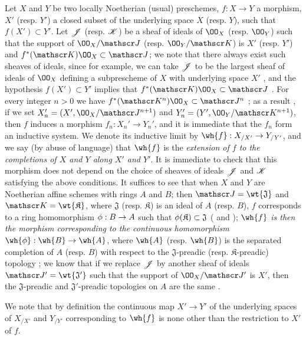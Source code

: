 \begin{env}[10.9.1]
\label{1.10.9.1}
Let $X$ and $Y$ be two locally Noetherian (usual) preschemes, $f:X\to Y$ a morphism, $X'$ (resp. $Y'$) a closed subset of the underlying space $X$ (resp. $Y$), such that $f(X')\subset Y'$.
Let $\mathscr{J}$ (resp. $\mathscr{K}$) be a sheaf of ideals of $\OO_X$ (resp. $\OO_Y$) such that the support of $\OO_X/\sh{J}$ (resp. $\OO_Y/\sh{K}$) is $X'$ (resp. $Y'$) and $f^*(\sh{K})\OO_X\subset\sh{J}$; we note that there always exist such sheaves of ideals, since for example, we can take $\mathscr{J}$ to be the largest sheaf of ideals of $\OO_X$ defining a subprescheme of $X$ with underlying space $X'$ , and the hypothesis $f(X')\subset Y'$ implies that $f^*(\sh{K})\OO_X\subset\sh{J}$ .
For every integer $n>0$ we have $f^*(\sh{K}^n)\OO_X\subset\sh{J}^n$ ; as a result , if we set $X_n'=(X',\OO_X/\sh{J}^{n+1})$ and $Y_n'=(Y',\OO_Y/\sh{K}^{n+1})$, then $f$ induces a morphism $f_n:X_n'\to Y_n'$, and it is immediate that the $f_n$ form an inductive system.
We denote its inductive limit  by $\wh{f}:X_{/X'}\to Y_{/Y'}$, and we say (by abuse of language) that $\wh{f}$ is the \emph{extension of $f$ to the completions of $X$ and $Y$ along $X'$ and $Y'$}.
It is immediate to check that this morphism does not depend on the choice of sheaves of ideals $\mathscr{J}$ and $\mathscr{K}$ satisfying the above conditions.
It suffices to see that when $X$ and $Y$ are Noetherian affine schemes with rings $A$ and $B$; then $\sh{J}=\wt{\mathfrak{J}}$ and $\sh{K}=\wt{\mathfrak{K}}$, where $\mathfrak{J}$ (resp. $\mathfrak{K}$) is an ideal of $A$ (resp. $B$), $f$ corresponds to a ring homomorphism $\vphi:B\to A$ such that $\phi(\mathfrak{K})\subset\mathfrak{J}$ ( and ); \emph{$\wh{f}$ is then the morphism corresponding  to the continuous homomorphism $\wh{\vphi}:\wh{B}\to\wh{A}$}, where $\wh{A}$ (resp. $\wh{B}$) is the separated completion of $A$ (resp. $B$) with respect to the $\mathfrak{J}$-preadic (resp. $\mathfrak{K}$-preadic) topology ; we know that if we replace $\mathscr{J}$ by another
sheaf of ideals $\sh{J}'=\wt{\mathfrak{J}'}$ such that the support of $\OO_X/\sh{J}'$ is $X'$, then the $\mathfrak{J}$-preadic and $\mathfrak{J}'$-preadic topologies on $A$ are the same .

We note that by definition the continuous map $X'\to Y'$ of the underlying spaces of $X_{/X'}$ and $Y_{/Y'}$ corresponding to $\wh{f}$ is none other than the restriction to $X'$ of $f$.
\end{env}

